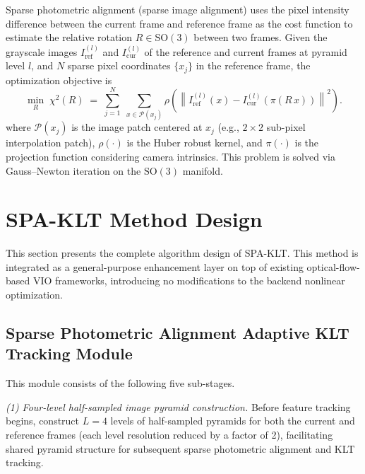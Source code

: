 \documentclass[journal,twoside,web]{ieeecolor}
\begin{document}
Sparse photometric alignment (sparse image alignment) uses the pixel intensity difference between the current frame and reference frame as the cost function to estimate the relative rotation $R \in \mathrm{SO}(3)$ between two frames. Given the grayscale images $I_{\mathrm{ref}}^{(l)}$ and $I_{\mathrm{cur}}^{(l)}$ of the reference and current frames at pyramid level $l$, and $N$ sparse pixel coordinates $\{x_{j}\}$ in the reference frame, the optimization objective is
\begin{equation}
\min_{R}\; \chi^{2}(R) \;=\; \sum_{j=1}^{N}\; \sum_{x \in \mathcal{P}(x_{j})} \rho\!\left( \left\| I_{\mathrm{ref}}^{(l)}(x) - I_{\mathrm{cur}}^{(l)}\!\left( \pi(R\, x) \right) \right\|^{2} \right).
\label{eq:spa_obj}
\end{equation}
where $\mathcal{P}(x_{j})$ is the image patch centered at $x_{j}$ (e.g., $2 \times 2$ sub-pixel interpolation patch), $\rho(\cdot)$ is the Huber robust kernel, and $\pi(\cdot)$ is the projection function considering camera intrinsics. This problem is solved via Gauss--Newton iteration on the $\mathrm{SO}(3)$ manifold.

\section{SPA-KLT Method Design}
\label{sec:system}

This section presents the complete algorithm design of SPA-KLT. This method is integrated as a general-purpose enhancement layer on top of existing optical-flow-based VIO frameworks, introducing no modifications to the backend nonlinear optimization.

\subsection{Sparse Photometric Alignment Adaptive KLT Tracking Module}

This module consists of the following five sub-stages.

\textit{(1) Four-level half-sampled image pyramid construction.} Before feature tracking begins, construct $L=4$ levels of half-sampled pyramids for both the current and reference frames (each level resolution reduced by a factor of 2), facilitating shared pyramid structure for subsequent sparse photometric alignment and KLT tracking.
\end{document}
